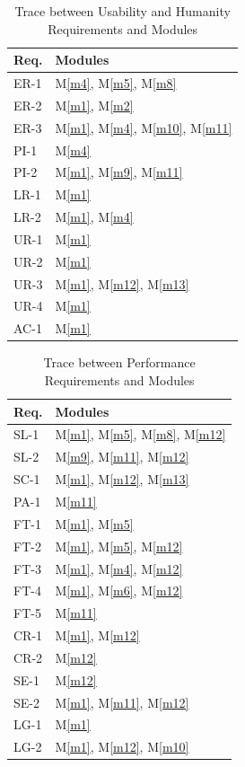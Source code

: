 \documentclass[12pt, titlepage]{article}
\newcommand{\mref}[1]{M\ref{#1}}
\begin{document}
\begin{table}[H]
\centering
\begin{tabular}{p{} p{}}
\toprule
\textbf{Req.} & \textbf{Modules}\\
\midrule
ER-1 & \mref{m4}, \mref{m5}, \mref{m8}  \\
ER-2 & \mref{m1}, \mref{m2} \\
ER-3 & \mref{m1}, \mref{m4}, \mref{m10}, \mref{m11} \\
PI-1 & \mref{m4} \\
PI-2 & \mref{m1}, \mref{m9}, \mref{m11} \\
LR-1 & \mref{m1} \\
LR-2 & \mref{m1}, \mref{m4} \\
UR-1 & \mref{m1} \\
UR-2 & \mref{m1}\\
UR-3 & \mref{m1}, \mref{m12}, \mref{m13} \\
UR-4 & \mref{m1} \\
AC-1 & \mref{m1} \\
\bottomrule
\end{tabular}
\caption{Trace between Usability and Humanity Requirements and Modules}
\label{TblRT_Usability}
\end{table}

\begin{table}[H]
\centering
\begin{tabular}{p{} p{}}
\toprule
\textbf{Req.} & \textbf{Modules}\\
\midrule
SL-1 & \mref{m1}, \mref{m5}, \mref{m8}, \mref{m12} \\
SL-2 & \mref{m9}, \mref{m11}, \mref{m12} \\
SC-1 & \mref{m1}, \mref{m12}, \mref{m13} \\
PA-1 & \mref{m11} \\
FT-1 & \mref{m1}, \mref{m5} \\
FT-2 & \mref{m1}, \mref{m5}, \mref{m12} \\
FT-3 & \mref{m1}, \mref{m4}, \mref{m12} \\
FT-4 & \mref{m1}, \mref{m6}, \mref{m12} \\
FT-5 & \mref{m11} \\
CR-1 & \mref{m1}, \mref{m12} \\
CR-2 & \mref{m12} \\
SE-1 & \mref{m12} \\
SE-2 & \mref{m1}, \mref{m11}, \mref{m12} \\
LG-1 & \mref{m1} \\
LG-2 & \mref{m1}, \mref{m12}, \mref{m10} \\
\bottomrule
\end{tabular}
\caption{Trace between Performance Requirements and Modules}
\label{TblRT_Perf}
\end{table}
\end{document}
